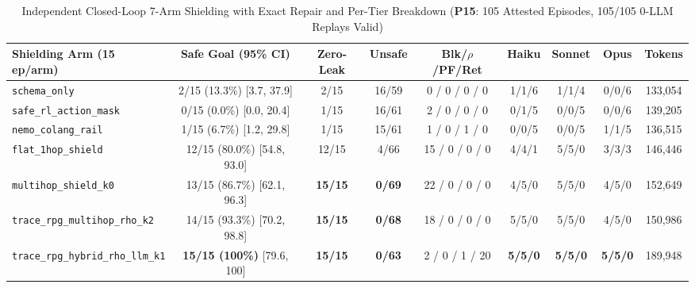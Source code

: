 \begin{table}[!tbp]
\caption{Independent Closed-Loop 7-Arm Shielding with Exact Repair and Per-Tier Breakdown (\textbf{P15}: 105 Attested Episodes, 105/105 0-LLM Replays Valid)}
\label{tab:kbs-mas}
\centering
\scriptsize
\setlength{\tabcolsep}{3.0pt}
\begin{tabularx}{\textwidth}{@{}>{\raggedright\arraybackslash}Xcccccccc@{}}
\toprule
\textbf{Shielding Arm (15 ep/arm)} & \textbf{Safe Goal (95\% CI)} & \textbf{Zero-Leak} & \textbf{Unsafe} & \textbf{Blk/$\rho$/PF/Ret} & \textbf{Haiku} & \textbf{Sonnet} & \textbf{Opus} & \textbf{Tokens} \\
\midrule
\texttt{schema\_only} & 2/15 (13.3\%) [3.7, 37.9] & 2/15 & 16/59 & 0 / 0 / 0 / 0 & 1/1/6 & 1/1/4 & 0/0/6 & 133,054 \\
\texttt{safe\_rl\_action\_mask}~\cite{alshiekh2018shield} & 0/15 (0.0\%) [0.0, 20.4] & 1/15 & 16/61 & 2 / 0 / 0 / 0 & 0/1/5 & 0/0/5 & 0/0/6 & 139,205 \\
\texttt{nemo\_colang\_rail}~\cite{rebedea2023nemo} & 1/15 (6.7\%) [1.2, 29.8] & 1/15 & 15/61 & 1 / 0 / 1 / 0 & 0/0/5 & 0/0/5 & 1/1/5 & 136,515 \\
\texttt{flat\_1hop\_shield} & 12/15 (80.0\%) [54.8, 93.0] & 12/15 & 4/66 & 15 / 0 / 0 / 0 & 4/4/1 & 5/5/0 & 3/3/3 & 146,446 \\
\texttt{multihop\_shield\_k0} & 13/15 (86.7\%) [62.1, 96.3] & \textbf{15/15} & \textbf{0/69} & 22 / 0 / 0 / 0 & 4/5/0 & 5/5/0 & 4/5/0 & 152,649 \\
\texttt{trace\_rpg\_multihop\_rho\_k2} & 14/15 (93.3\%) [70.2, 98.8] & \textbf{15/15} & \textbf{0/68} & 18 / 0 / 0 / 0 & 5/5/0 & 5/5/0 & 4/5/0 & 150,986 \\
\texttt{trace\_rpg\_hybrid\_rho\_llm\_k1} & \textbf{15/15 (100\%)} [79.6, 100] & \textbf{15/15} & \textbf{0/63} & 2 / 0 / 1 / 20 & \textbf{5/5/0} & \textbf{5/5/0} & \textbf{5/5/0} & 189,948 \\
\bottomrule
\end{tabularx}
\end{table}

